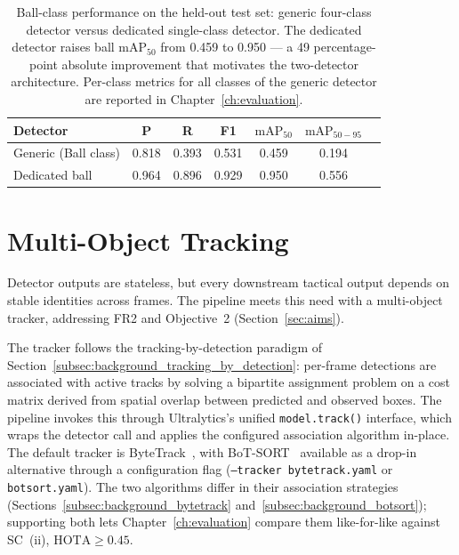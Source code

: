 \begin{table}[!htbp]
\centering
\small
\renewcommand{\arraystretch}{1.15}
\begin{tabular}{lcccccc}
\toprule
\textbf{Detector} & \textbf{P} & \textbf{R} & \textbf{F1} & \textbf{$\mathrm{mAP}_{50}$} & \textbf{$\mathrm{mAP}_{50-95}$} \\
\midrule
Generic (Ball class)   & 0.818 & 0.393 & 0.531 & 0.459 & 0.194 \\
Dedicated ball         & 0.964 & 0.896 & 0.929 & 0.950 & 0.556 \\
\bottomrule
\end{tabular}
\caption[Ball-class performance: generic vs.\ dedicated detector.]{Ball-class performance on the held-out test set: generic four-class
detector versus dedicated single-class detector. The dedicated detector
raises ball $\mathrm{mAP}_{50}$ from 0.459 to 0.950 --- a 49 percentage-point absolute
improvement that motivates the two-detector architecture. Per-class metrics
for all classes of the generic detector are reported in
Chapter~\ref{ch:evaluation}.}
\label{tab:detection_ball_comparison}
\end{table}

\section{Multi-Object Tracking}
\label{sec:methodology_tracking}

Detector outputs are stateless, but every downstream tactical output depends
on stable identities across frames. The pipeline meets this need with a
multi-object tracker, addressing FR2 and Objective~2 (Section~\ref{sec:aims}).

The tracker follows the tracking-by-detection paradigm of
Section~\ref{subsec:background_tracking_by_detection}: per-frame detections
are associated with active tracks by solving a bipartite assignment problem
on a cost matrix derived from spatial overlap between predicted and observed
boxes. The pipeline invokes this through Ultralytics's unified
\texttt{model.track()} interface, which wraps the detector call and applies
the configured association algorithm in-place. The default tracker is
ByteTrack~\cite{ByteTrack}, with BoT-SORT~\cite{BoTSORT} available as a
drop-in alternative through a configuration flag (\texttt{--tracker
bytetrack.yaml} or \texttt{botsort.yaml}). The two algorithms differ in their
association strategies (Sections~\ref{subsec:background_bytetrack}
and~\ref{subsec:background_botsort}); supporting both lets
Chapter~\ref{ch:evaluation} compare them like-for-like against SC~(ii),
$\mathrm{HOTA} \geq 0.45$.

